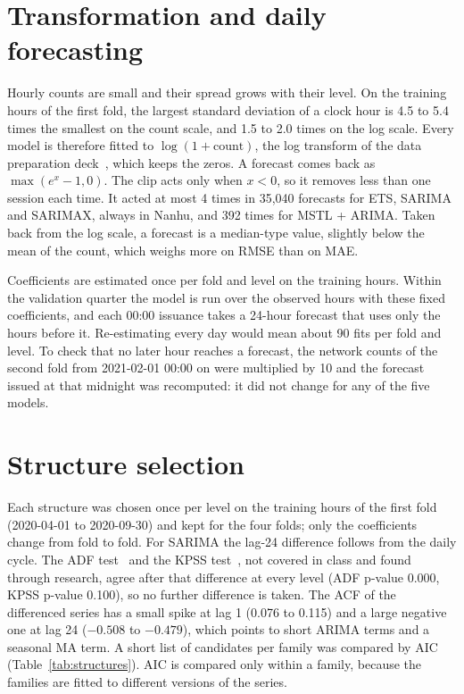 \documentclass[12pt,a4paper,openany]{report}
\begin{document}
\section{Transformation and daily forecasting}\label{sec:transform}

Hourly counts are small and their spread grows with their level. On the training hours of the first fold, the
largest standard deviation of a clock hour is 4.5 to 5.4 times the smallest on the count scale, and 1.5 to 2.0 times
on the log scale. Every model is therefore fitted to $\log(1 + \text{count})$, the log transform of the data
preparation deck~\cite{mindd03}, which keeps the zeros. A forecast comes back as $\max(e^{x} - 1, 0)$. The clip acts
only when $x < 0$, so it removes less than one session each time. It acted at most 4 times in 35,040 forecasts for
\ac{ETS}, \ac{SARIMA} and \ac{SARIMAX}, always in Nanhu, and 392 times for \ac{MSTL} + \ac{ARIMA}. Taken back from
the log scale, a forecast is a median-type value, slightly below the mean of the count, which weighs more on
\ac{RMSE} than on \ac{MAE}.

Coefficients are estimated once per fold and level on the training hours. Within the validation quarter the model is
run over the observed hours with these fixed coefficients, and each 00:00 issuance takes a 24-hour forecast that uses
only the hours before it. Re-estimating every day would mean about 90 fits per fold and level. To check that no
later hour reaches a forecast, the network counts of the second fold from 2021-02-01 00:00 on were multiplied by 10
and the forecast issued at that midnight was recomputed: it did not change for any of the five models.

\section{Structure selection}\label{sec:selection}

Each structure was chosen once per level on the training hours of the first fold (2020-04-01 to 2020-09-30) and
kept for the four folds; only the coefficients change from fold to fold. For \ac{SARIMA} the lag-24 difference
follows from the daily cycle. The \ac{ADF} test~\cite{dickeyfuller1979} and the \ac{KPSS} test~\cite{kpss1992}, not
covered in class and found through research, agree after that difference at every level (\ac{ADF} p-value 0.000,
\ac{KPSS} p-value 0.100), so no further difference is taken. The \ac{ACF} of the differenced series has a small spike
at lag 1 (0.076 to 0.115) and a large negative one at lag 24 ($-0.508$ to $-0.479$), which points to short
\ac{ARIMA} terms and a seasonal MA term. A short list of candidates per family was compared by \ac{AIC}
(Table~\ref{tab:structures}). \ac{AIC} is compared only within a family, because the families are fitted to
different versions of the series.
\end{document}
